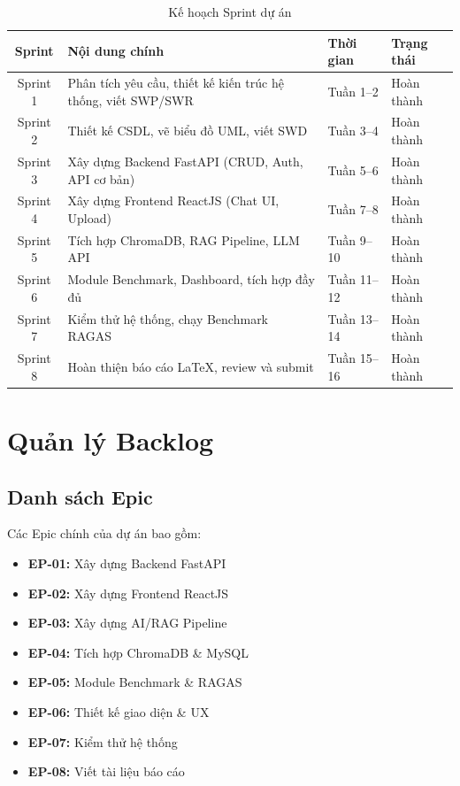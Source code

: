 \begin{table}[H]
  \centering
  \caption{Kế hoạch Sprint dự án}
  \label{tab:sprint-plan}
  \renewcommand{\arraystretch}{1.4}
  \begin{tabularx}{\textwidth}{|c|X|l|l|}
    \hline
    \rowcolor{blue!10}
    \textbf{Sprint} & \textbf{Nội dung chính} & \textbf{Thời gian} & \textbf{Trạng thái} \\
    \hline
    Sprint 1 & Phân tích yêu cầu, thiết kế kiến trúc hệ thống, viết SWP/SWR & Tuần 1--2 & \textcolor{green!60!black}{Hoàn thành} \\
    \hline
    Sprint 2 & Thiết kế CSDL, vẽ biểu đồ UML, viết SWD & Tuần 3--4 & \textcolor{green!60!black}{Hoàn thành} \\
    \hline
    Sprint 3 & Xây dựng Backend FastAPI (CRUD, Auth, API cơ bản) & Tuần 5--6 & \textcolor{green!60!black}{Hoàn thành} \\
    \hline
    Sprint 4 & Xây dựng Frontend ReactJS (Chat UI, Upload) & Tuần 7--8 & \textcolor{green!60!black}{Hoàn thành} \\
    \hline
    Sprint 5 & Tích hợp ChromaDB, RAG Pipeline, LLM API & Tuần 9--10 & \textcolor{green!60!black}{Hoàn thành} \\
    \hline
    Sprint 6 & Module Benchmark, Dashboard, tích hợp đầy đủ & Tuần 11--12 & \textcolor{green!60!black}{Hoàn thành} \\
    \hline
    Sprint 7 & Kiểm thử hệ thống, chạy Benchmark RAGAS & Tuần 13--14 & \textcolor{green!60!black}{Hoàn thành} \\
    \hline
    Sprint 8 & Hoàn thiện báo cáo LaTeX, review và submit & Tuần 15--16 & \textcolor{green!60!black}{Hoàn thành} \\
    \hline
  \end{tabularx}
\end{table}

\section{Quản lý Backlog}

\subsection{Danh sách Epic}

Các Epic chính của dự án bao gồm:
\begin{itemize}[itemsep=3pt]
  \item \textbf{EP-01:} Xây dựng Backend FastAPI
  \item \textbf{EP-02:} Xây dựng Frontend ReactJS
  \item \textbf{EP-03:} Xây dựng AI/RAG Pipeline
  \item \textbf{EP-04:} Tích hợp ChromaDB \& MySQL
  \item \textbf{EP-05:} Module Benchmark \& RAGAS
  \item \textbf{EP-06:} Thiết kế giao diện \& UX
  \item \textbf{EP-07:} Kiểm thử hệ thống
  \item \textbf{EP-08:} Viết tài liệu báo cáo
\end{itemize}

